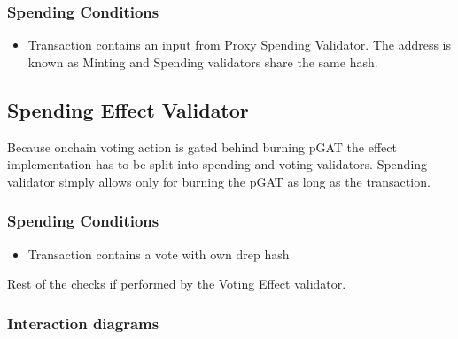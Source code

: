\documentclass{article}
\begin{document}
\subsubsection*{Spending Conditions}

\begin{itemize}
  \item Transaction contains an input from Proxy Spending Validator. The address is known as Minting and Spending validators share the same hash.
\end{itemize}

\subsection{Spending Effect Validator}

Because onchain voting action is gated behind burning pGAT the effect implementation has to be split into spending and voting validators. Spending validator simply allows only for burning the pGAT as long as the transaction.

\subsubsection*{Spending Conditions}

\begin{itemize}
  \item Transaction contains a vote with own drep hash
\end{itemize}

Rest  of the checks if performed by the Voting Effect validator.

\subsubsection*{Interaction diagrams}
\end{document}
